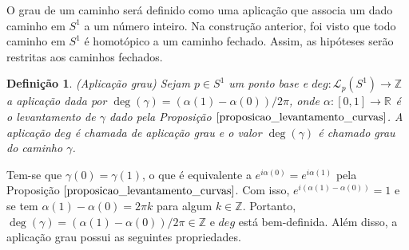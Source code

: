\documentclass[12pt]{book}
\newtheorem{definicao}[teorema]{Definição}
\newcommand{\caminhos}{\mathcal{L}}
\newcommand{\caminhospontobasegeral}[2]{\caminhos_{#1}(#2)}
\newcommand{\circulo}{S^{1}}
\newcommand{\inteiros}{\mathbb{Z}}
\newcommand{\real}[1]{\mathbb{R}^{#1}}
\begin{document}
	O grau de um caminho será definido como uma aplicação que associa um dado caminho em $\circulo$ a um número inteiro. Na construção anterior, foi visto que todo caminho em $\circulo$ é homotópico a um caminho fechado. Assim, as hipóteses serão restritas aos caminhos fechados.

	\begin{definicao}\label{definicao_aplicacao_grau}
		(Aplicação grau) Sejam $p \in \circulo$ um ponto base e $deg: \caminhospontobasegeral{p}{\circulo} \to \inteiros$ a aplicação dada por $\deg(\gamma) = (\alpha(1)-\alpha(0))/2\pi$, onde $\alpha:[0,1] \to \real{}$ é o levantamento de $\gamma$ dado pela Proposição $\ref{proposicao_levantamento_curvas}$. A aplicação $deg$ é chamada de aplicação grau e o valor $\deg(\gamma)$ é chamado grau do caminho $\gamma$.
	\end{definicao}
	
	Tem-se que $\gamma(0) = \gamma(1)$, o que é equivalente a $e^{i\alpha(0)} = e^{i\alpha(1)}$ pela Proposição $\ref{proposicao_levantamento_curvas}$. Com isso, $e^{i(\alpha(1)-\alpha(0))} = 1$ e se tem  $\alpha(1)-\alpha(0) = 2\pi k$ para algum $k \in \inteiros$. Portanto, $\deg(\gamma) = (\alpha(1)-\alpha(0))/2\pi \in \inteiros$ e $deg$ está bem-definida. Além disso, a aplicação grau possui as seguintes propriedades.
	
\end{document}
